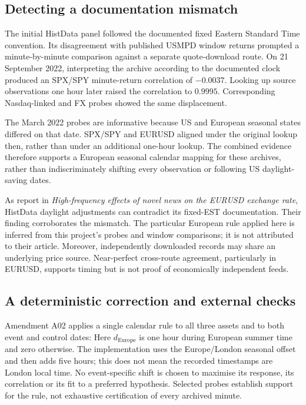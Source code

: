 \label{sec:clock}
\subsection{Detecting a documentation mismatch}
The initial HistData panel followed the documented fixed Eastern Standard Time convention. Its disagreement with published USMPD window returns prompted a minute-by-minute comparison against a separate quote-download route. On 21 September 2022, interpreting the archive according to the documented clock produced an SPX/SPY minute-return correlation of $-0.0037$. Looking up source observations one hour later raised the correlation to $0.9995$. Corresponding Nasdaq-linked and FX probes showed the same displacement.


The March 2022 probes are informative because US and European seasonal states differed on that date. SPX/SPY and EURUSD aligned under the original lookup then, rather than under an additional one-hour lookup. The combined evidence therefore supports a European seasonal calendar mapping for these archives, rather than indiscriminately shifting every observation or following US daylight-saving dates.

As  report in \textit{High-frequency effects of novel news on the EURUSD exchange rate}, HistData daylight adjustments can contradict its fixed-EST documentation. Their finding corroborates the mismatch. The particular European rule applied here is inferred from this project's probes and window comparisons; it is not attributed to their article. Moreover, independently downloaded records may share an underlying price source. Near-perfect cross-route agreement, particularly in EURUSD, supports timing but is not proof of economically independent feeds.


\subsection{A deterministic correction and external checks}
Amendment A02 applies a single calendar rule to all three assets and to both event and control dates:
Here $d_{\mathrm{Europe}}$ is one hour during European summer time and zero otherwise. The implementation uses the Europe/London seasonal offset and then adds five hours; this does not mean the recorded timestamps are London local time. No event-specific shift is chosen to maximise its response, its correlation or its fit to a preferred hypothesis. Selected probes establish support for the rule, not exhaustive certification of every archived minute.

